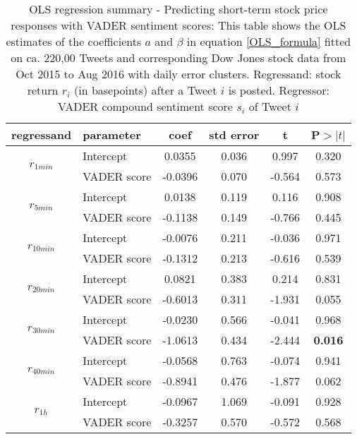 \documentclass[a4paper,12pt]{article}%
\begin{document}
\begin{table}
\centering
\captionsetup{justification=centering}
\begin{tabularx}{0.76\textwidth}{c|l|cccc}
 regressand & parameter & coef & std error & t & P$>|t|$\\ \hline

\multirow{2}{*}{$r_{1min}$} & Intercept &       0.0355  &        0.036     &     0.997  &         0.320 \\
& VADER score &      -0.0396  &        0.070     &    -0.564  &         0.573      \\ \hline

\multirow{2}{*}{$r_{5min}$} & Intercept & 0.0138  &        0.119     &     0.116  &         0.908    \\
& VADER score &      -0.1138  &        0.149     &    -0.766  &         0.445         \\ \hline

\multirow{2}{*}{$r_{10min}$} & Intercept &      -0.0076  &        0.211     &    -0.036  &         0.971        \\
& VADER score &      -0.1312  &        0.213     &    -0.616  &         0.539          \\ \hline

\multirow{2}{*}{$r_{20min}$} & Intercept &       0.0821  &        0.383     &     0.214  &         0.831        \\
& VADER score &      -0.6013  &        0.311     &    -1.931  &         0.055          \\ \hline

\multirow{2}{*}{$r_{30min}$} & Intercept    &      -0.0230  &        0.566     &    -0.041  &         0.968  \\
& VADER score &      -1.0613  &        0.434     &    -2.444  &        \textbf{0.016}     \\ \hline

\multirow{2}{*}{$r_{40min}$} & Intercept &      -0.0568  &        0.763     &    -0.074  &         0.941\\
& VADER score &      -0.8941  &        0.476     &    -1.877  &         0.062   \\ \hline

\multirow{2}{*}{$r_{1h}$} & Intercept   &  -0.0967  &        1.069     &    -0.091  &         0.928  \\
& VADER score &   -0.3257  &        0.570     &    -0.572  &         0.568    \\ \hline

\end{tabularx}
\caption[Regression Summary Short-Term Stock Returns and Tweet Sentiment]{OLS regression summary - Predicting short-term stock price responses with VADER sentiment scores: This table shows the OLS estimates of the coefficients $a$ and $\beta$ in equation \ref{OLS_formula} fitted on ca. 220,00 Tweets and corresponding Dow Jones stock data from Oct 2015 to Aug 2016 with daily error clusters. Regressand: stock return $r_i$ (in basepoints) after a Tweet $i$ is posted. Regressor: VADER compound sentiment score $s_i$ of Tweet $i$ \label{vader_short_term_30min}}
\end{table}
\end{document}
